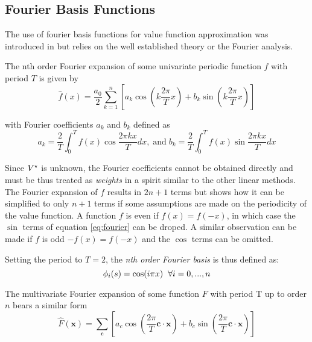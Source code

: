 \subsection{Fourier Basis Functions}

The use of fourier basis functions for value function approximation was introduced in
\cite{Konidaris2011b} but relies on the well established theory or the Fourier analysis.

The nth order Fourier expansion of some univariate periodic function $f$ with period
$T$ is given by
\begin{equation}
\hat{f}(x) = \frac{a_0}{2} \sum_{k=1}^n \left[ a_k \cos\left(k\frac{2\pi}{T} x\right) +
b_k \sin \left(k \frac{2\pi}{T}x \right) \right]
\label{eq:fourier}
\end{equation}

with Fourier coefficients $a_k$ and $b_k$ defined as
\begin{equation}
a_k = \frac{2}{T} \int_0^T f(x) \cos \frac{2\pi kx}{T}dx, \; \mbox{and} \; b_k = \frac{2}
{T} \int_0^T f(x) \sin \frac{2\pi kx}{T}dx
\end{equation}

Since $V^\star$ is unknown, the Fourier coefficients cannot be obtained directly
and must be thus treated as \textit{weights} in a spirit similar to the other linear
methods. The Fourier expansion of $f$ results in $2n+1$ terms but
\cite{Konidaris2011b} shows how it can be simplified to only $n+1$ terms if some
assumptions are made on the periodicity of the value function. A function $f$ is even if
$f(x) = f(-x)$, in which case the $\sin$ terms of equation \ref{eq:fourier} can be
droped. A similar observation can be made if $f$ is odd $-f(x) = f(-x)$ and the
$\cos$ terms can be omitted. 


Setting the period to $T=2$, the \textit{nth order Fourier basis} is thus defined as:
\begin{equation}
\phi_i(s) = \cos(i\pi x) \hspace{2mm} \forall i = 0, ..., n
\end{equation}

The multivariate Fourier expansion of some function $F$ with period T up to order $n$
bears a similar form
\begin{equation}
\hat{F}(\mathbf{x}) = \sum_{\mathbf{c}} \left[ a_c \cos \left( \frac{2\pi}{T} \mathbf{c}
\cdot \mathbf{x} \right) +  b_c \sin \left( \frac{2\pi}{T} \mathbf{c} \cdot \mathbf{x}
\right)\right]
\label{eq:multi-fourier}
\end{equation}

